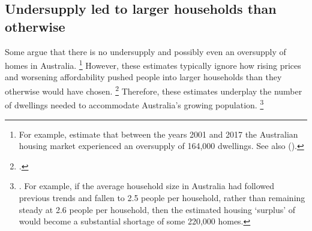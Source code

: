 \subsection{Undersupply led to larger households than otherwise}\label{subsec:undersupply-led-to-larger-households}

Some argue that there is no undersupply and possibly even an oversupply of homes in Australia.%
    \footnote{For example, \textcite{Phillipshousingshortage2017} estimate that between the years 2001 and 2017 the Australian housing market experienced an oversupply of 164,000 dwellings. See also (\textcites{Janda2017b}{RBA2015SubmissionHomeOwnershipInquiry}).} %
However, these estimates typically ignore how rising prices and worsening affordability pushed people into larger households than they otherwise would have chosen.%
    \footcite{Kearns2012dwellings}
Therefore, these estimates underplay the number of dwellings needed to accommodate Australia's growing population.%
    \footnote{\textcite{Daley-Coates-2017-Ben-phillips}. For example, if the average household size in Australia had followed previous trends and fallen to 2.5 people per household, rather than remaining steady at 2.6 people per household, then the estimated housing `surplus' of \textcite{Phillipshousingshortage2017} would become a substantial shortage of some 220,000 homes.} %

